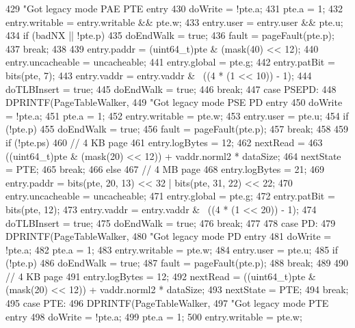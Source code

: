 \begin{DoxyCode}
{{429                 "Got legacy mode PAE PTE entry %
430         doWrite = !pte.a;
431         pte.a = 1;
432         entry.writable = entry.writable && pte.w;
433         entry.user = entry.user && pte.u;
434         if (badNX || !pte.p) {
435             doEndWalk = true;
436             fault = pageFault(pte.p);
437             break;
438         }
439         entry.paddr = (uint64_t)pte & (mask(40) << 12);
440         entry.uncacheable = uncacheable;
441         entry.global = pte.g;
442         entry.patBit = bits(pte, 7);
443         entry.vaddr = entry.vaddr & ~((4 * (1 << 10)) - 1);
444         doTLBInsert = true;
445         doEndWalk = true;
446         break;
447       case PSEPD:
448         DPRINTF(PageTableWalker,
449                 "Got legacy mode PSE PD entry %
450         doWrite = !pte.a;
451         pte.a = 1;
452         entry.writable = pte.w;
453         entry.user = pte.u;
454         if (!pte.p) {
455             doEndWalk = true;
456             fault = pageFault(pte.p);
457             break;
458         }
459         if (!pte.ps) {
460             // 4 KB page
461             entry.logBytes = 12;
462             nextRead =
463                 ((uint64_t)pte & (mask(20) << 12)) + vaddr.norml2 * dataSize;
464             nextState = PTE;
465             break;
466         } else {
467             // 4 MB page
468             entry.logBytes = 21;
469             entry.paddr = bits(pte, 20, 13) << 32 | bits(pte, 31, 22) << 22;
470             entry.uncacheable = uncacheable;
471             entry.global = pte.g;
472             entry.patBit = bits(pte, 12);
473             entry.vaddr = entry.vaddr & ~((4 * (1 << 20)) - 1);
474             doTLBInsert = true;
475             doEndWalk = true;
476             break;
477         }
478       case PD:
479         DPRINTF(PageTableWalker,
480                 "Got legacy mode PD entry %
481         doWrite = !pte.a;
482         pte.a = 1;
483         entry.writable = pte.w;
484         entry.user = pte.u;
485         if (!pte.p) {
486             doEndWalk = true;
487             fault = pageFault(pte.p);
488             break;
489         }
490         // 4 KB page
491         entry.logBytes = 12;
492         nextRead = ((uint64_t)pte & (mask(20) << 12)) + vaddr.norml2 * dataSize;
493         nextState = PTE;
494         break;
495       case PTE:
496         DPRINTF(PageTableWalker,
497                 "Got legacy mode PTE entry %
498         doWrite = !pte.a;
499         pte.a = 1;
500         entry.writable = pte.w;
}}
\end{DoxyCode}
